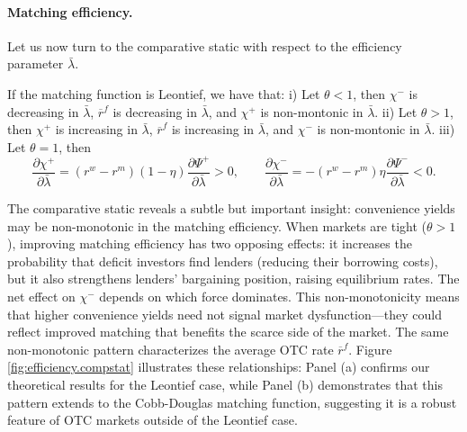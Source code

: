 \documentclass[12pt,american,english,notitlepage]{article}
\begin{document}
\paragraph{Matching efficiency.}
Let us now turn to the comparative static with respect to the efficiency parameter $\bar{\lambda}$.

\begin{proposition}\label{prop:derivatives.lambda}
If the matching function is Leontief, we have that:
i) Let $\theta<1$, then $\chi^{-}$ is decreasing in $\bar{\lambda}$,
$\overline{r}^{f}$ is decreasing in $\bar{\lambda}$, and $\chi^{+}$
is non-montonic in $\bar{\lambda}$.
ii) Let $\theta>1$, then $\chi^{+}$ is increasing in $\bar{\lambda}$,
$\overline{r}^{f}$ is increasing in $\bar{\lambda}$, and $\chi^{-}$
is non-montonic in $\bar{\lambda}$.
iii) Let $\theta=1$, then
\[
\frac{\partial\chi^{+}}{\partial\bar{\lambda}}=(r^{w}-r^{m})\left(1-\eta\right)\frac{\partial\Psi^{+}}{\partial\bar{\lambda}}>0,\qquad\frac{\partial\chi^{-}}{\partial\bar{\lambda}}=-(r^{w}-r^{m})\eta\frac{\partial\Psi^{-}}{\partial\bar{\lambda}}<0.
\]

\end{proposition}

The comparative static reveals a subtle but important insight: convenience yields may be non-monotonic in the matching efficiency.
When markets are tight
($\theta>1$), improving matching efficiency has two opposing effects: it increases the probability that deficit investors find lenders (reducing
their borrowing costs), but it also strengthens lenders' bargaining
position, raising equilibrium rates. The net effect on $\chi^{-}$
depends on which force dominates. This non-monotonicity means that
higher convenience yields need not signal market dysfunction---they
could reflect improved matching that benefits the scarce side of the
market. The same non-monotonic pattern
characterizes the average OTC rate $\overline{r}^{f}$. Figure \ref{fig:efficiency.compstat}
illustrates these relationships: Panel (a) confirms our theoretical
results for the Leontief case, while Panel (b) demonstrates that this
pattern extends to the Cobb-Douglas matching function, suggesting it is a robust feature of OTC markets outside of the Leontief case. 
\end{document}
